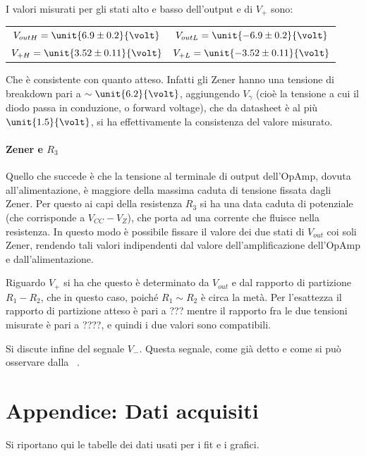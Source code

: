 \documentclass[10pt,a4paper]{article}
\begin{document}
I valori misurati per gli stati alto e basso dell'output e di $V_+$ sono:

\begin{table}[H]
	\centering
	\begin{tabular}{cc}
        $ V_{out H} = \unit{6.9 \pm 0.2}{\volt}$  & $V_{out L} = \unit{-6.9 \pm 0.2}{\volt}$\\
        $ V_{+ H} = \unit{3.52 \pm 0.11}{\volt}$  & $V_{+ L} = \unit{-3.52 \pm 0.11}{\volt}$
	\end{tabular}
\end{table}

Che è consistente con quanto atteso. Infatti gli Zener hanno una tensione di breakdown pari a $\sim \unit{6.2}{\volt}$, aggiungendo $V_\gamma$ (cioè la tensione a cui il diodo passa in conduzione, o forward voltage), che da datasheet è al più $\unit{1.5}{\volt}$, si ha effettivamente la consistenza del valore misurato.

\paragraph{Zener e $R_3$} Quello che succede è che la tensione al terminale di output dell'OpAmp, dovuta all'alimentazione, è maggiore della massima caduta di tensione fissata dagli Zener. Per questo ai capi della resistenza $R_3$ si ha una data caduta di potenziale (che corrisponde a $V_{CC}-V_Z$), che porta ad una corrente che fluisce nella resistenza. In questo modo è possibile fissare il valore dei due stati di $V_{out}$ coi soli Zener, rendendo tali valori indipendenti dal valore dell'amplificazione dell'OpAmp e dall'alimentazione.

Riguardo $V_+$ si ha che questo è determinato da $V_{out}$ e dal rapporto di partizione $R_1 - R_2$, che in questo caso, poiché $R_1 \sim R_2$ è circa la metà. Per l'esattezza il rapporto di partizione atteso è pari a ??? mentre il rapporto fra le due tensioni misurate è pari a ????, e quindi i due valori sono compatibili.

Si discute infine del segnale $V_-$. Questa segnale, come già detto e come si può osservare dalla \figurename{~}.

\pagebreak
\section{Appendice: Dati acquisiti}
Si riportano qui le tabelle dei dati usati per i fit e i grafici.

\centering
\begin{figure}[h!]
	\begin{minipage}[t]{0.49\textwidth}
		\centering
		\resizebox{0.7\textwidth}{!}{
		}
		\label{tab:GBW}
	\end{minipage}
	\begin{minipage}[t]{0.5\textwidth}
		\centering
		\resizebox{0.7\textwidth}{!}{
		}
		\label{tab:V_t}
	\end{minipage}
\end{figure}
\end{document}
